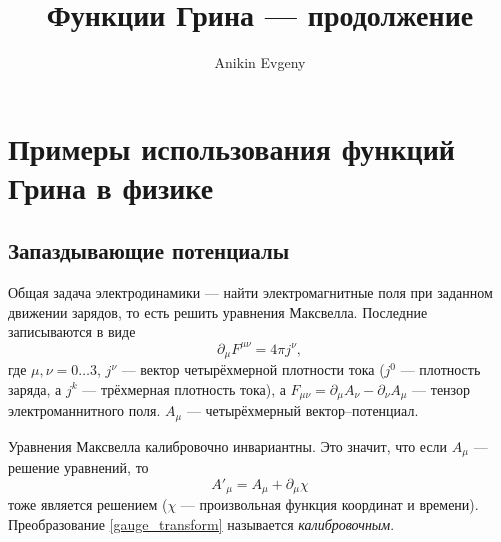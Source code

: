 \documentclass{article}
\title{Функции Грина --- продолжение}
\author{Anikin Evgeny}
\begin{document}
\maketitle
\section{Примеры использования функций Грина в физике}
\subsection{Запаздывающие потенциалы}
Общая задача электродинамики --- найти электромагнитные поля при заданном
движении зарядов, то есть решить уравнения Максвелла. Последние записываются в виде
\begin{equation}
    \partial_\mu F^{\mu \nu} = 4\pi j^{\nu},
\end{equation}
где $\mu, \nu = 0\dots3$, $j^\nu$ --- вектор четырёхмерной плотности тока 
($j^0$ --- плотность заряда, а $j^{k}$ --- трёхмерная плотность тока), а 
$F_{\mu\nu} = \partial_\mu A_\nu - \partial_\nu A_\mu$ --- тензор электроманнитного поля. 
$A_\mu$ --- четырёхмерный вектор--потенциал. 

Уравнения Максвелла калибровочно инвариантны. Это значит, что если $A_\mu$ --- решение
уравнений, то 
\begin{equation}
    \label{gauge_transform}
   A'_\mu = A_\mu + \partial_\mu \chi
\end{equation}
тоже является решением ($\chi$ --- произвольная функция координат и времени). Преобразование
\eqref{gauge_transform} называется \emph{калибровочным}.
\end{document}
